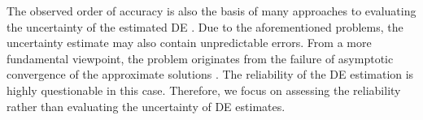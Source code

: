 The observed order of accuracy is also the basis of many approaches to evaluating the uncertainty of the estimated DE \citep{Orozco2010VerificationSolutions,Phillips2014RichardsonDynamics}. Due to the aforementioned problems, the uncertainty estimate may also contain unpredictable errors. From a more fundamental viewpoint, the problem originates from the failure of asymptotic convergence of the approximate solutions \citep{Roy2010}. The reliability of the DE estimation is highly questionable in this case. Therefore, we focus on assessing the reliability rather than evaluating the uncertainty of DE estimates.

